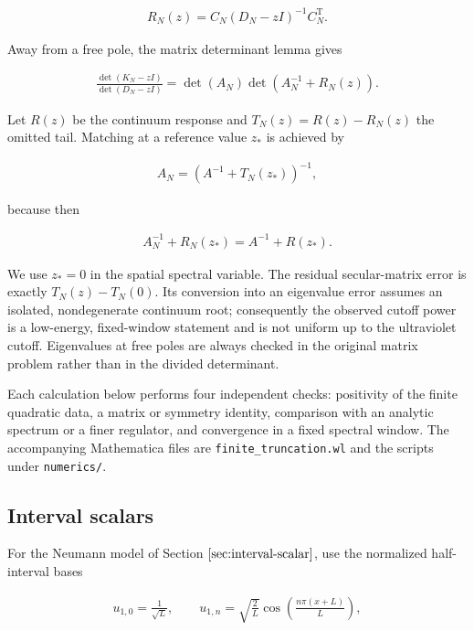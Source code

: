 \begin{align}
R_N(z)=C_N(D_N-zI)^{-1}C_N^{\mathrm T}.
\end{align}

Away from a free pole, the matrix determinant lemma gives

\begin{align}
\frac{\det(K_N-zI)}{\det(D_N-zI)}
=\det(A_N)\det\!\left(A_N^{-1}+R_N(z)\right).
\end{align}

Let $R(z)$ be the continuum response and $T_N(z)=R(z)-R_N(z)$ the omitted tail. Matching at a reference value $z_*$ is achieved by

\begin{align}
A_N=\left(A^{-1}+T_N(z_*)\right)^{-1},
\end{align}

because then

\begin{align}
A_N^{-1}+R_N(z_*)=A^{-1}+R(z_*).
\end{align}

We use $z_*=0$ in the spatial spectral variable. The residual secular-matrix error is exactly $T_N(z)-T_N(0)$. Its conversion into an eigenvalue error assumes an isolated, nondegenerate continuum root; consequently the observed cutoff power is a low-energy, fixed-window statement and is not uniform up to the ultraviolet cutoff. Eigenvalues at free poles are always checked in the original matrix problem rather than in the divided determinant.

Each calculation below performs four independent checks: positivity of the finite quadratic data, a matrix or symmetry identity, comparison with an analytic spectrum or a finer regulator, and convergence in a fixed spectral window. The accompanying Mathematica files are \texttt{finite\_truncation.wl} and the scripts under \texttt{numerics/}.

\subsection{Interval scalars}\label{subsec:numerics-interval}

For the Neumann model of Section $\ref{sec:interval-scalar}$, use the normalized half-interval bases

\begin{align}
u_{1,0}=\frac1{\sqrt L},
\qquad
u_{1,n}=\sqrt{\frac2L}\cos\!\left(\frac{n\pi(x+L)}L\right),
\end{align}

